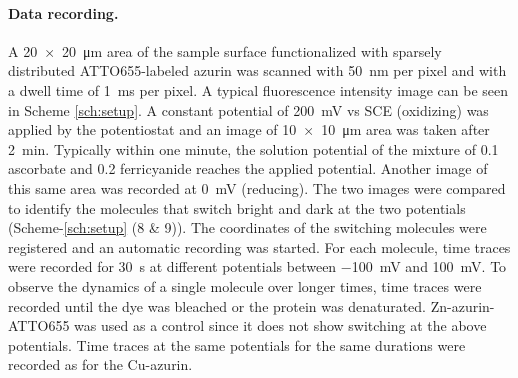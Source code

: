 \paragraph*{Data recording.}
A \SI[product-units=repeat]{20x20}{\um} area of the sample surface functionalized with sparsely distributed ATTO655-labeled azurin was scanned with \SI{50}{\nm} per pixel and with a dwell time of \SI{1}{\ms} per pixel.
A typical fluorescence intensity image can be seen in Scheme \ref{sch:setup}.
A constant potential of \SI{200}{\mV} vs SCE (oxidizing) was applied by the potentiostat and an image of \SI[product-units=repeat]{10x10}{\um} area was taken after \SI{2}{\minute}.
Typically within one minute, the solution potential of the mixture of \SI{0.1}{\mM} ascorbate and \SI{0.2}{\mM} ferricyanide reaches the applied potential.
Another image of this same area was recorded at \SI{0}{\mV} (reducing).
The two images were compared to identify the molecules that switch bright and dark at the two potentials (Scheme-\ref{sch:setup} (8 \& 9)).
The coordinates of the switching molecules were registered and an automatic recording was started.
For each molecule, time traces were recorded for \SI{30}{\s} at different potentials between \SI{-100}{\mV} and \SI{100}{\mV}.
To observe the dynamics of a single molecule over longer times, time traces were recorded until the dye was  bleached or the protein was denaturated.
Zn-azurin-ATTO655 was used as a control since it does not show switching at the above potentials.
Time traces at the same potentials for the same durations were recorded as for the Cu-azurin.



